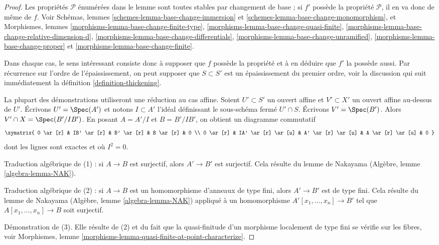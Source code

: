 \begin{proof}
Les propriétés $\mathcal{P}$ énumérées dans le lemme sont toutes stables
par changement de base ; si $f'$ possède la propriété $\mathcal{P}$,
il en va donc de même de $f$. Voir
Schémas, lemmes \ref{schemes-lemma-base-change-immersion} et
\ref{schemes-lemma-base-change-monomorphism},
et
Morphismes, lemmes
\ref{morphisms-lemma-base-change-finite-type},
\ref{morphisms-lemma-base-change-quasi-finite},
\ref{morphisms-lemma-base-change-relative-dimension-d},
\ref{morphisms-lemma-base-change-differentials},
\ref{morphisms-lemma-base-change-unramified},
\ref{morphisms-lemma-base-change-proper} et
\ref{morphisms-lemma-base-change-finite}.

\medskip\noindent
Dans chaque cas, le sens intéressant consiste donc à supposer
que $f$ possède la propriété et à en déduire que $f'$ la possède aussi.
Par récurrence sur l'ordre de l'épaississement, on peut
supposer que $S \subset S'$ est un épaississement du premier ordre, voir
la discussion qui suit immédiatement
la définition \ref{definition-thickening}.

\medskip\noindent
La plupart des démonstrations utiliseront une réduction au cas affine. Soient
$U' \subset S'$ un ouvert affine et $V' \subset X'$ un ouvert affine
au-dessus de $U'$. Écrivons $U' = \Spec(A')$ et notons $I \subset A'$ l'idéal
définissant le sous-schéma fermé $U' \cap S$. Écrivons $V' = \Spec(B')$.
Alors $V' \cap X = \Spec(B'/IB')$. En posant $A = A'/I$ et
$B = B'/IB'$, on obtient un diagramme commutatif
$$
\xymatrix{
0 \ar[r] &
IB' \ar[r] &
B' \ar[r] &
B \ar[r] & 0 \\
0 \ar[r] &
IA' \ar[r] \ar[u] &
A' \ar[r] \ar[u] &
A \ar[r] \ar[u] & 0
}
$$
dont les lignes sont exactes et où $I^2 = 0$.

\medskip\noindent
Traduction algébrique de (1) : si $A \to B$ est surjectif,
alors $A' \to B'$ est surjectif. Cela résulte du
lemme de Nakayama (Algèbre, lemme \ref{algebra-lemma-NAK}).

\medskip\noindent
Traduction algébrique de (2) : si $A \to B$ est un homomorphisme d'anneaux
de type fini, alors $A' \to B'$ est de type fini. Cela résulte du
lemme de Nakayama (Algèbre, lemme \ref{algebra-lemma-NAK})
appliqué à un homomorphisme $A'[x_1, \ldots, x_n] \to B'$ tel que
$A[x_1, \ldots, x_n] \to B$ soit surjectif.

\medskip\noindent
Démonstration de (3). Elle résulte de (2) et du fait que la quasi-finitude d'un morphisme
localement de type fini se vérifie sur les fibres, voir
Morphismes, lemme \ref{morphisms-lemma-quasi-finite-at-point-characterize}.


\end{proof}
